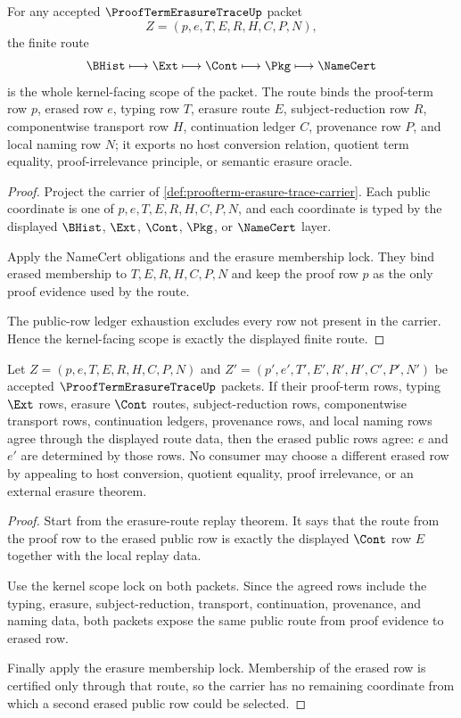 \begin{theorem}
\label{thm:proof-term-erasure-trace-kernel-scope-lock}
For any accepted $\ProofTermErasureTraceUp$ packet
$$
Z=(p,e,T,E,R,H,C,P,N),
$$
the finite route
$$
\BHist \longmapsto \Ext \longmapsto \Cont \longmapsto \Pkg \longmapsto \NameCert
$$
is the whole kernel-facing scope of the packet. The route binds the proof-term row $p$, erased row $e$, typing row $T$, erasure route $E$, subject-reduction row $R$, componentwise transport row $H$, continuation ledger $C$, provenance row $P$, and local naming row $N$; it exports no host conversion relation, quotient term equality, proof-irrelevance principle, or semantic erasure oracle.
\end{theorem}
\begin{proof}
Project the carrier of \autoref{def:proofterm-erasure-trace-carrier}. Each public coordinate is one of $p,e,T,E,R,H,C,P,N$, and each coordinate is typed by the displayed $\BHist$, $\Ext$, $\Cont$, $\Pkg$, or $\NameCert$ layer.

Apply the NameCert obligations and the erasure membership lock. They bind erased membership to $T,E,R,H,C,P,N$ and keep the proof row $p$ as the only proof evidence used by the route.

The public-row ledger exhaustion excludes every row not present in the carrier. Hence the kernel-facing scope is exactly the displayed finite route.
\end{proof}

\begin{theorem}
\label{thm:proof-term-erasure-trace-erased-row-determinacy}
Let $Z=(p,e,T,E,R,H,C,P,N)$ and $Z'=(p',e',T',E',R',H',C',P',N')$ be accepted $\ProofTermErasureTraceUp$ packets. If their proof-term rows, typing $\Ext$ rows, erasure $\Cont$ routes, subject-reduction rows, componentwise transport rows, continuation ledgers, provenance rows, and local naming rows agree through the displayed route data, then the erased public rows agree: $e$ and $e'$ are determined by those rows. No consumer may choose a different erased row by appealing to host conversion, quotient equality, proof irrelevance, or an external erasure theorem.
\end{theorem}
\begin{proof}
Start from the erasure-route replay theorem. It says that the route from the proof row to the erased public row is exactly the displayed $\Cont$ row $E$ together with the local replay data.

Use the kernel scope lock on both packets. Since the agreed rows include the typing, erasure, subject-reduction, transport, continuation, provenance, and naming data, both packets expose the same public route from proof evidence to erased row.

Finally apply the erasure membership lock. Membership of the erased row is certified only through that route, so the carrier has no remaining coordinate from which a second erased public row could be selected.
\end{proof}

